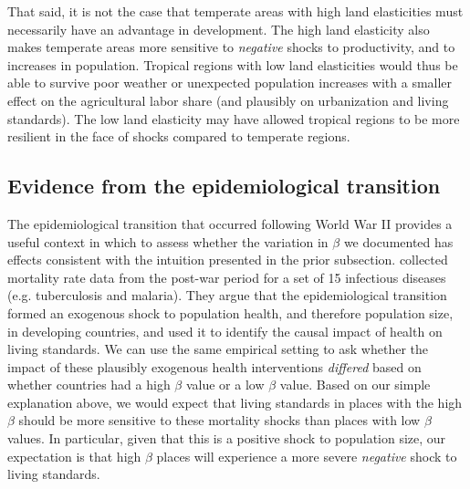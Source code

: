 \documentclass[11pt]{article}
\begin{document}
That said, it is not the case that temperate areas with high land elasticities must necessarily have an advantage in development. The high land elasticity also makes temperate areas more sensitive to \textit{negative} shocks to productivity, and to increases in population. Tropical regions with low land elasticities would thus be able to survive poor weather or unexpected population increases with a smaller effect on the agricultural labor share (and plausibly on urbanization and living standards). The low land elasticity may have allowed tropical regions to be more resilient in the face of shocks compared to temperate regions.

\subsection{Evidence from the epidemiological transition}\label{SEC_ajtest}
The epidemiological transition that occurred following World War II provides a useful context in which to assess whether the variation in $\beta$ we documented has effects consistent with the intuition presented in the prior subsection. \cite{aj07} collected mortality rate data from the post-war period for a set of 15 infectious diseases (e.g. tuberculosis and malaria). They argue that the epidemiological transition formed an exogenous shock to population health, and therefore population size, in developing countries, and used it to identify the causal impact of health on living standards. We can use the same empirical setting to ask whether the impact of these plausibly exogenous health interventions \textit{differed} based on whether countries had a high $\beta$ value or a low $\beta$ value. Based on our simple explanation above, we would expect that living standards in places with the high $\beta$ should be more sensitive to these mortality shocks than places with low $\beta$ values. In particular, given that this is a positive shock to population size, our expectation is that high $\beta$ places will experience a more severe \textit{negative} shock to living standards.
\end{document}

